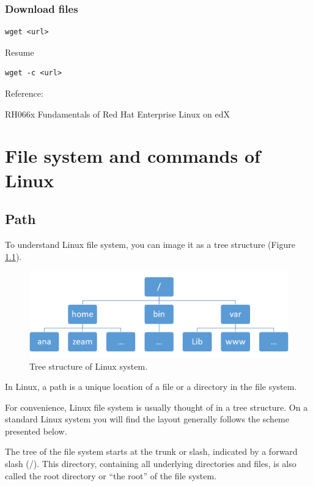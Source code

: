\documentclass[]{book}
\theoremstyle{definition}
\theoremstyle{definition}
\theoremstyle{definition}
\theoremstyle{remark}
\begin{document}
\subsection{Download files}\label{download-files}

\begin{verbatim}
wget <url>
\end{verbatim}

Resume

\begin{verbatim}
wget -c <url>  
\end{verbatim}

Reference:

RH066x Fundamentals of Red Hat Enterprise Linux on edX

\chapter{File system and commands of
Linux}\label{file-system-and-commands-of-linux}

\section{Path}\label{path}

To understand Linux file system, you can image it as a tree structure
(Figure \ref{fig:linuxTreeStruc}).



\begin{figure}
\centering
\includegraphics{figures/LinuxPathTree.png}
\caption{\label{fig:linuxTreeStruc}Tree structure of Linux system.}
\end{figure}

In Linux, a path is a unique location of a file or a directory in the
file system.

For convenience, Linux file system is usually thought of in a tree
structure. On a standard Linux system you will find the layout generally
follows the scheme presented below.

The tree of the file system starts at the trunk or slash, indicated by a
forward slash (/). This directory, containing all underlying directories
and files, is also called the root directory or ``the root'' of the file
system.
\end{document}

